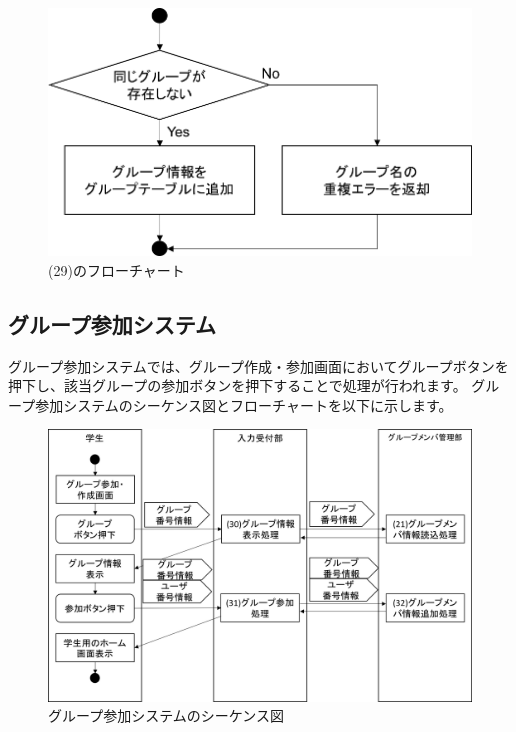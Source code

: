 \begin{figure}[htbp]
  \begin{center}
    \includegraphics[width=0.75\linewidth,clip]{./img/flow/29.png}
    \caption{(29)のフローチャート}\label{fig:29}
  \end{center}
\end{figure}


\clearpage

\subsection{グループ参加システム}
グループ参加システムでは、グループ作成・参加画面においてグループボタンを押下し、該当グループの参加ボタンを押下することで処理が行われます。
グループ参加システムのシーケンス図とフローチャートを以下に示します。

\begin{figure}[htbp]
  \begin{center}
    \includegraphics[width=1\linewidth,clip]{./img/seq8.png}
    \caption{グループ参加システムのシーケンス図}\label{fig:seq8}
  \end{center}
\end{figure}

